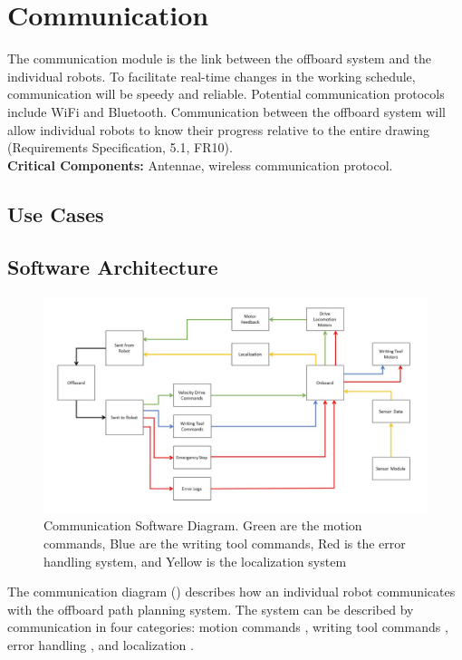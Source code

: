 
\section{Communication}
\label{sec:communication}
The communication module is the link between the offboard system and the individual robots. To facilitate real-time changes in the working schedule, communication will be speedy and reliable. Potential communication protocols include WiFi and Bluetooth. Communication between the offboard system will allow individual robots to know their progress relative to the entire drawing (Requirements Specification, 5.1, FR10). \\
\textbf{Critical Components:} Antennae, wireless communication protocol. \\

\subsection{Use Cases}

\subsection{Software Architecture}
\label{sec:sw_arch_communication}

\begin{figure}[h!]
 \centering
  \includegraphics[width=0.99\columnwidth]{diagrams/sw_arch_communication.jpg}
	\caption{Communication Software Diagram. Green are the motion commands, Blue are the writing tool commands, Red is the error handling system, and Yellow is the localization system}
 \label{fig:comm_processing}
\end{figure}

The communication diagram () describes how an individual robot communicates with the offboard path planning system. The system can be described by communication in four categories: motion commands , writing tool commands , error handling , and localization .

